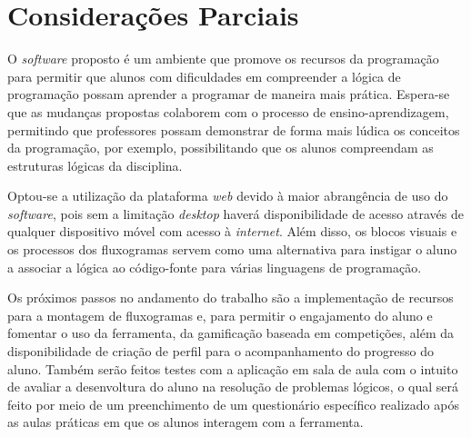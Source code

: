 \documentclass[12pt]{article}
\begin{document}
\section{Considerações Parciais}
O \textit{software} proposto é um ambiente que promove os recursos da programação para permitir que alunos com dificuldades em compreender a lógica de programação possam aprender a programar de maneira mais prática. Espera-se que as mudanças propostas colaborem com o processo de ensino-aprendizagem, permitindo que professores possam demonstrar de forma mais lúdica os conceitos da programação, por exemplo, possibilitando que os alunos compreendam as estruturas lógicas da disciplina.
\par Optou-se a utilização da plataforma \textit{web} devido à maior abrangência de uso do \textit{software}, pois sem a limitação \textit{desktop} haverá disponibilidade de acesso através de qualquer dispositivo móvel com acesso à \textit{internet}. Além disso, os blocos visuais e os processos dos fluxogramas servem como uma alternativa para instigar o aluno a associar a lógica ao código-fonte para várias linguagens de programação. 
\par Os próximos passos no andamento do trabalho são a implementação de recursos para a montagem de fluxogramas e, para permitir o engajamento do aluno e fomentar o uso da ferramenta, da gamificação baseada em competições, além da disponibilidade de criação de perfil para o acompanhamento do progresso do aluno. Também serão feitos testes com a aplicação em sala de aula com o intuito de avaliar a desenvoltura do aluno na resolução de problemas lógicos, o qual será feito por meio de um preenchimento de um questionário específico realizado após as aulas práticas em que os alunos interagem com a ferramenta.



\end{document}

